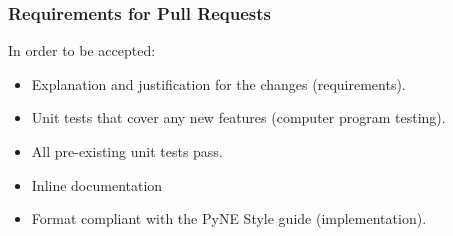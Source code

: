\documentclass[12pt]{beamer}
\begin{document}
\begin{frame}
\begin{columns}
\begin{column}{0.5\textwidth}
\end{column}
\end{columns}


\end{frame}

\begin{frame}
\frametitle{Requirements for Pull Requests}

In order to be accepted:

\begin{itemize}
\item{Explanation and justification for the changes (\alert{requirements}).}
\item{Unit tests that cover any new features (\alert{computer program testing}).}
\item{All pre-existing unit tests pass.}
\item{Inline documentation}
\item{Format compliant with the PyNE Style guide (\alert{implementation}).}
\end{itemize}

\end{frame}
\end{document}
